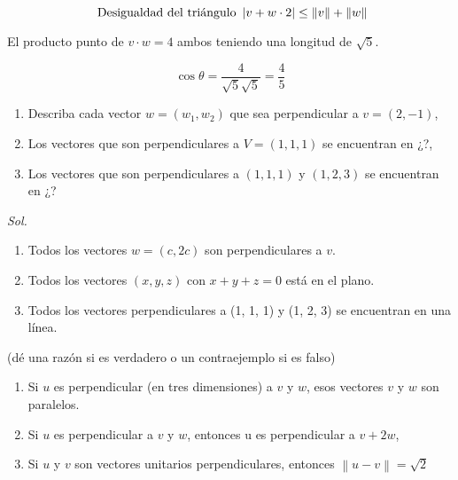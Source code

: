 \begin{equation}
	\textup{ Desigualdad del triángulo } \left\lvert v+w \cdot 2\right\rvert  \leq \left\lVert v\right\rVert  + \left\lVert w \right\rVert
\end{equation}

\begin{example}
	El producto punto de $v \cdot w= 4$ ambos teniendo una longitud de $\sqrt{5} $.

	\begin{equation*}
		\cos \theta = \frac{4}{\sqrt{5} \sqrt{5}} = \frac{4}{5}
	\end{equation*}
\end{example}

\begin{problem}
\begin{enumerate}
	\item Describa cada vector $w = (w_{1}, w_2 )$ que sea perpendicular a $v = (2, -1)$,
	\item Los vectores que son perpendiculares a $V = (1, 1, 1)$ se encuentran en ¿?,
	\item Los vectores que son perpendiculares a $(1, 1, 1)$ y $(1,2,3)$ se encuentran en ¿?
\end{enumerate}
\end{problem}

\textit{ Sol. }

\begin{enumerate}
	\item Todos los vectores $w = (c, 2c)$ son perpendiculares a $v$.
	\item Todos los vectores $(x, y, z)$ con $x + y + z = 0$
	      está en el plano.
	\item Todos los vectores perpendiculares a (1, 1, 1) y (1, 2, 3) se encuentran en una línea.
\end{enumerate}


\begin{problem}
(dé una razón si es verdadero o un contraejemplo si es falso)
\end{problem}


\begin{enumerate}
	\item Si $u$ es perpendicular (en tres dimensiones) a $v$ y $w$, esos vectores $v$ y $w$ son paralelos.
	\item Si $u$ es perpendicular a $v$ y $w$, entonces u es perpendicular a $v + 2w$,
	\item Si $u$ y $v$ son vectores unitarios perpendiculares, entonces $\left\lVert u-v\right\rVert = \sqrt{2} $
\end{enumerate}


